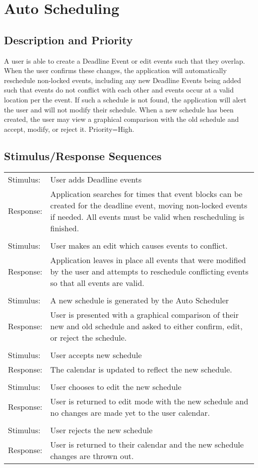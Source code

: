 \documentclass{scrreprt}
\begin{document}
\section{Auto Scheduling}

\subsection{Description and Priority}
A user is able to create a Deadline Event or edit events such that they overlap.
When the user confirms these changes, the application will automatically reschedule
non-locked events, including any new Deadline Events being added such that events
do not conflict with each other and events occur at a valid location per the event.
If such a schedule is not found, the application will alert the user and will not
modify their schedule. When a new schedule has been created, the user may view a
graphical comparison with the old schedule and accept, modify, or reject it.
Priority=High.

\subsection{Stimulus/Response Sequences}
\begin{center}
\begin{tabular}{ p{2cm} p{13cm} }
Stimulus: & User adds Deadline events\\
Response: & Application searches for times that event blocks can be created for
the deadline event, moving non-locked events if needed.  All events must be valid
when rescheduling is finished.\\
\\
Stimulus: & User makes an edit which causes events to conflict.\\
Response: & Application leaves in place all events that were modified by the user
and attempts to reschedule conflicting events so that all events are valid.\\
\\
Stimulus: & A new schedule is generated by the Auto Scheduler\\
Response: & User is presented with a graphical comparison of their new and old
schedule and asked to either confirm, edit, or reject the schedule.\\
\\
Stimulus: & User accepts new schedule\\
Response: & The calendar is updated to reflect the new schedule.\\
\\
Stimulus: & User chooses to edit the new schedule\\
Response: & User is returned to edit mode with the new schedule and no changes
are made yet to the user calendar.\\
\\
Stimulus: & User rejects the new schedule\\
Response: & User is returned to their calendar and the new schedule changes
are thrown out.\\
\end{tabular}
\end{center}
\end{document}
